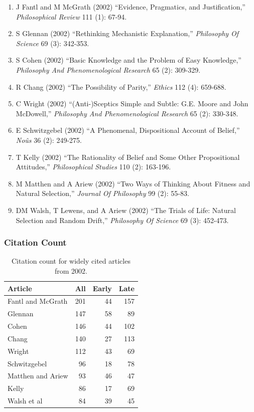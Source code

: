 \documentclass[
  10pt,
  letterpaper,
  DIV=11,
  numbers=noendperiod,
  twoside]{scrartcl}
\providecommand{\tightlist}{%
  \setlength{\itemsep}{0pt}\setlength{\parskip}{0pt}}\usepackage{longtable,booktabs,array}
\begin{document}
\begin{enumerate}
\def\labelenumi{\arabic{enumi}.}
\tightlist
\item
  J Fantl and M McGrath (2002) ``Evidence, Pragmatics, and
  Justification,'' \emph{Philosophical Review} 111 (1): 67-94.
\item
  S Glennan (2002) ``Rethinking Mechanistic Explanation,''
  \emph{Philosophy Of Science} 69 (3): 342-353.
\item
  S Cohen (2002) ``Basic Knowledge and the Problem of Easy Knowledge,''
  \emph{Philosophy And Phenomenological Research} 65 (2): 309-329.
\item
  R Chang (2002) ``The Possibility of Parity,'' \emph{Ethics} 112 (4):
  659-688.
\item
  C Wright (2002) ``(Anti-)Sceptics Simple and Subtle: G.E. Moore and
  John McDowell,'' \emph{Philosophy And Phenomenological Research} 65
  (2): 330-348.
\item
  E Schwitzgebel (2002) ``A Phenomenal, Dispositional Account of
  Belief,'' \emph{Noûs} 36 (2): 249-275.
\item
  T Kelly (2002) ``The Rationality of Belief and Some Other
  Propositional Attitudes,'' \emph{Philosophical Studies} 110 (2):
  163-196.
\item
  M Matthen and A Ariew (2002) ``Two Ways of Thinking About Fitness and
  Natural Selection,'' \emph{Journal Of Philosophy} 99 (2): 55-83.
\item
  DM Walsh, T Lewens, and A Ariew (2002) ``The Trials of Life: Natural
  Selection and Random Drift,'' \emph{Philosophy Of Science} 69 (3):
  452-473.
\end{enumerate}

\subsubsection*{Citation Count}\label{sec-count-2002}

\begin{longtable}[]{@{}lrrr@{}}

\caption{\label{tbl-citation-count-2002}Citation count for widely cited
articles from 2002.}

\tabularnewline

\toprule\noalign{}
Article & All & Early & Late \\
\midrule\noalign{}
\endhead
\bottomrule\noalign{}
\endlastfoot
Fantl and McGrath & 201 & 44 & 157 \\
Glennan & 147 & 58 & 89 \\
Cohen & 146 & 44 & 102 \\
Chang & 140 & 27 & 113 \\
Wright & 112 & 43 & 69 \\
Schwitzgebel & 96 & 18 & 78 \\
Matthen and Ariew & 93 & 46 & 47 \\
Kelly & 86 & 17 & 69 \\
Walsh et al & 84 & 39 & 45 \\

\end{longtable}
\end{document}
